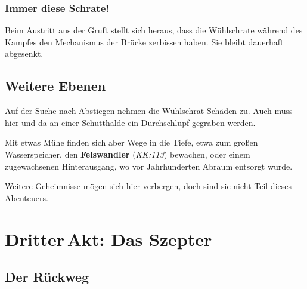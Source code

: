 \neuespalte

\subsubsection{Immer diese Schrate!}
\begin{center}
\end{center}
Beim Austritt aus der Gruft stellt sich heraus, dass die Wühlschrate während des Kampfes den Mechanismus der Brücke zerbissen haben. Sie bleibt dauerhaft abgesenkt.
\spaltenende
{}
\platz

\spaltenanfang

\subsection{Weitere Ebenen}
Auf der Suche nach Abstiegen nehmen die Wühlschrat-Schäden zu. Auch muss hier und da an einer Schutthalde ein Durchschlupf gegraben werden.

Mit etwas Mühe finden sich aber Wege in die Tiefe, etwa zum großen Wasserspeicher, den \textbf{Felswandler} (\emph{KK:113}) bewachen, oder einem zugewachsenen Hinterausgang, wo vor Jahrhunderten Abraum entsorgt wurde.

Weitere Geheimnisse mögen sich hier verbergen, doch sind sie nicht Teil dieses Abenteuers.

\spaltenende

\neueseite

\section{Dritter\,Akt: Das Szepter}
\spaltenanfang
\subsection{Der Rückweg}
\label{zuruck}

